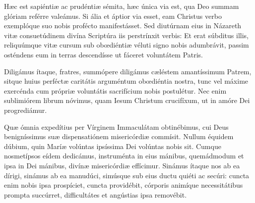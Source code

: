 {\noindent Hæc est sapiéntiæ ac prudéntiæ sémita, hæc única via est, qua Deo summam glóriam reférre valeámus. Si ália et áptior via esset, eam Christus verbo exemplóque suo nobis profécto manifestásset. Sed diutúrnam eius in Názareth vitæ consuetúdinem divína Scriptúra iis perstrínxit verbis: Et erat súbditus illis, reliquúmque vitæ cursum sub obœdiéntiæ véluti signo nobis adumbrávit, passim osténdens eum in terras descendísse ut fáceret voluntátem Patris.

\noindent Diligámus ítaque, fratres, summópere diligámus cæléstem amantíssimum Patrem, sitque huius perféctæ caritátis arguméntum obœdiéntia nostra, tunc vel máxime exercénda cum própriæ voluntátis sacrifícium nobis postulétur. Nec enim sublimiórem librum nóvimus, quam Iesum Christum crucifíxum, ut in amóre Dei progrediámur.

\noindent Quæ ómnia expedítius per Vírginem Immaculátam obtinébimus, cui Deus benigníssimus suæ dispensatiónem misericórdiæ commísit. Nullum équidem dúbium, quin Maríæ volúntas ipsíssima Dei volúntas nobis sit. Cumque nosmetípsos eídem dedicámus, instruménta in eius mánibus, quemádmodum et ipsa in Dei mánibus, divínæ misericórdiæ effícimur. Sinámus ítaque nos ab ea dírigi, sinámus ab ea manudúci, simúsque sub eius ductu quiéti ac secúri: cuncta enim nobis ipsa prospíciet, cuncta providébit, córporis animíque necessitátibus prompta succúrret, difficultátes et angústias ipsa removébit.}
\newcommand{\responsoriumiii}{\pars{Responsorium 3.} \scriptura{\textbf{H373}}

\vspace{-5mm}

\responsorium{III}{temporalia/resp-istecognovit-CROCHU-cumdox.gtex}{}}
\newcommand{\hymnuslaudes}{\pars{Hymnus}

\cuminitiali{VI}{temporalia/hym-MartyrDei.gtex}}
\newcommand{\lectiobrevis}{\pars{Lectio Brevis.} \scriptura{2 Cor. 1, 3-5}

\noindent Benedíctus Deus et Pater Dómini nostri Iesu Christi, Pater misericordiárum et Deus totíus consolatiónis, qui consolátur nos in omni tribulatióne nostra, ut possímus et ipsi consolári eos, qui in omni pressúra sunt, per exhortatiónem, qua exhortámur et ipsi a Deo; quóniam, sicut abúndant passiónes Christi in nobis, ita per Christum abúndat et consolátio nostra.}
\newcommand{\responsoriumbreve}{\pars{Responsorium breve.} \scriptura{Ex. 15, 2}

\cuminitiali{VI}{temporalia/resp-fortitudomeaetlausmea.gtex}}
\newcommand{\benedictus}{\pars{Canticum Zachariæ.} \scriptura{Io. 15, 13; \textbf{H363}}

\vspace{-4mm}

\antiphona{I g}{temporalia/ant-majoremcaritatem.gtex}

\vspace{-2mm}

\scriptura{Lc. 1, 68-79}

\vspace{-2mm}

\cantusSineNeumas
\initiumpsalmi{temporalia/benedictus-initium-i-g-auto.gtex}


 \Abardot{}}
